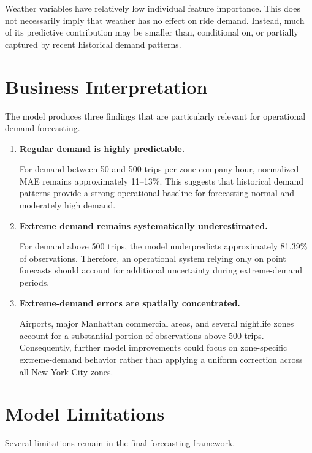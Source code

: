 \documentclass[11pt]{article}
\begin{document}
Weather variables have relatively low individual feature importance.
This does not necessarily imply that weather has no effect on ride
demand. Instead, much of its predictive contribution may be smaller
than, conditional on, or partially captured by recent historical
demand patterns.


\section{Business Interpretation}

The model produces three findings that are particularly relevant
for operational demand forecasting.

\begin{enumerate}

\item \textbf{Regular demand is highly predictable.}

For demand between 50 and 500 trips per zone-company-hour, normalized
MAE remains approximately 11--13\%. This suggests that historical
demand patterns provide a strong operational baseline for forecasting
normal and moderately high demand.

\item \textbf{Extreme demand remains systematically underestimated.}

For demand above 500 trips, the model underpredicts approximately
81.39\% of observations. Therefore, an operational system relying
only on point forecasts should account for additional uncertainty
during extreme-demand periods.

\item \textbf{Extreme-demand errors are spatially concentrated.}

Airports, major Manhattan commercial areas, and several nightlife
zones account for a substantial portion of observations above
500 trips. Consequently, further model improvements could focus on
zone-specific extreme-demand behavior rather than applying a uniform
correction across all New York City zones.

\end{enumerate}


\section{Model Limitations}

Several limitations remain in the final forecasting framework.
\end{document}
